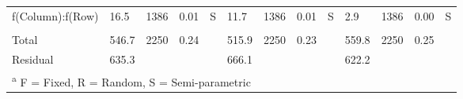 \documentclass[
  letterpaper,
  DIV=11,
  numbers=noendperiod]{scrartcl}
\begin{document}
\begin{landscape}
\begin{table}[H]
{\begin{tabular}[t]{lllllllllllll}
f(Column):f(Row) & 16.5 & 1386 & 0.01 & S & 11.7 & 1386 & 0.01 & S & 2.9 & 1386 & 0.00 & S\\
 &  &  &  &  &  &  &  &  &  &  &  & \\
Total & 546.7 & 2250 & 0.24 &  & 515.9 & 2250 & 0.23 &  & 559.8 & 2250 & 0.25 & \\
\addlinespace
Residual & 635.3 &  &  &  & 666.1 &  &  &  & 622.2 &  &  & \\
\bottomrule
\multicolumn{13}{l}{\rule{0pt}{1em}\textsuperscript{a} F = Fixed, R = Random, S = Semi-parametric}\\
\end{tabular}}
\end{table}

\end{landscape}

\begin{landscape}


\end{landscape}
\end{document}
